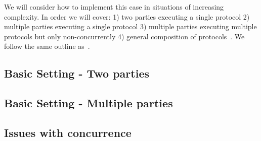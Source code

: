\documentclass{article}
\begin{document}
We will consider how to implement this case in situations of increasing complexity.  In order we will cover: 1) two parties executing a single protocol 2) multiple parties executing a single protocol 3) multiple parties executing multiple protocols but only non-concurrently 4) general composition of protocols~\cite{canettiUC}.  We follow the same outline as~\cite{canettiTutorial}.

\subsection{Basic Setting - Two parties}

\subsection{Basic Setting - Multiple parties}

\subsection{Issues with concurrence}


\end{document}
